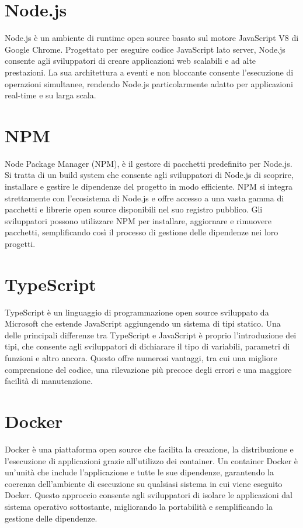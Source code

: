 \documentclass[12pt,a4paper,openright,twoside]{book}
\begin{document}
\section{Node.js}

Node.js è un ambiente di runtime open source basato sul motore JavaScript V8 di Google Chrome. Progettato per eseguire codice JavaScript lato server, Node.js consente agli sviluppatori di creare applicazioni web scalabili e ad alte prestazioni. La sua architettura a eventi e non bloccante consente l'esecuzione di operazioni simultanee, rendendo Node.js particolarmente adatto per applicazioni real-time e su larga scala.

\section{NPM}

Node Package Manager (NPM), è il gestore di pacchetti predefinito per Node.js. Si tratta di un build system che consente agli sviluppatori di Node.js di scoprire, installare e gestire le dipendenze del progetto in modo efficiente. NPM si integra strettamente con l'ecosistema di Node.js e offre accesso a una vasta gamma di pacchetti e librerie open source disponibili nel suo registro pubblico. Gli sviluppatori possono utilizzare NPM per installare, aggiornare e rimuovere pacchetti, semplificando così il processo di gestione delle dipendenze nei loro progetti.

\section{TypeScript}

TypeScript è un linguaggio di programmazione open source sviluppato da Microsoft che estende JavaScript aggiungendo un sistema di tipi statico. Una delle principali differenze tra TypeScript e JavaScript è proprio l'introduzione dei tipi, che consente agli sviluppatori di dichiarare il tipo di variabili, parametri di funzioni e altro ancora. Questo offre numerosi vantaggi, tra cui una migliore comprensione del codice, una rilevazione più precoce degli errori e una maggiore facilità di manutenzione. 

\section{Docker}

Docker è una piattaforma open source che facilita la creazione, la distribuzione e l'esecuzione di applicazioni grazie all'utilizzo dei container. Un container Docker è un'unità che include l'applicazione e tutte le sue dipendenze, garantendo la coerenza dell'ambiente di esecuzione su qualsiasi sistema in cui viene eseguito Docker. Questo approccio consente agli sviluppatori di isolare le applicazioni dal sistema operativo sottostante, migliorando la portabilità e semplificando la gestione delle dipendenze.
\end{document}
